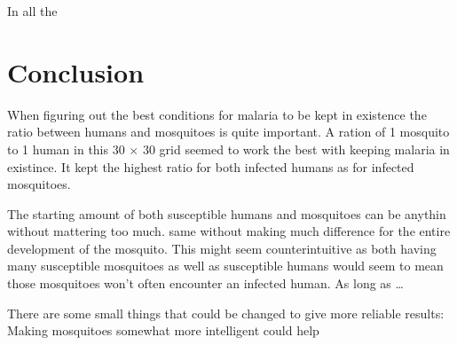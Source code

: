 \documentclass[a4paper]{report}
\begin{document}
In all the 

\section{Conclusion}
When figuring out the best conditions for malaria to be kept in existence the
ratio between humans and mosquitoes is quite important. A ration of 1 mosquito
to 1 human in this 30 $\times$ 30 grid seemed to work the best with keeping
malaria in existince. It kept the highest ratio for both infected humans as for
infected mosquitoes.

The starting amount of both susceptible humans and mosquitoes can be anythin
without mattering too much. 
same without making much difference for the entire development of the mosquito.
This might seem counterintuitive as both having many susceptible mosquitoes as
well as susceptible humans would seem to mean those mosquitoes won't often
encounter an infected human. As long as \dots

There are some small things that could be changed to give more reliable results:
Making mosquitoes somewhat more intelligent could help

\end{document}
